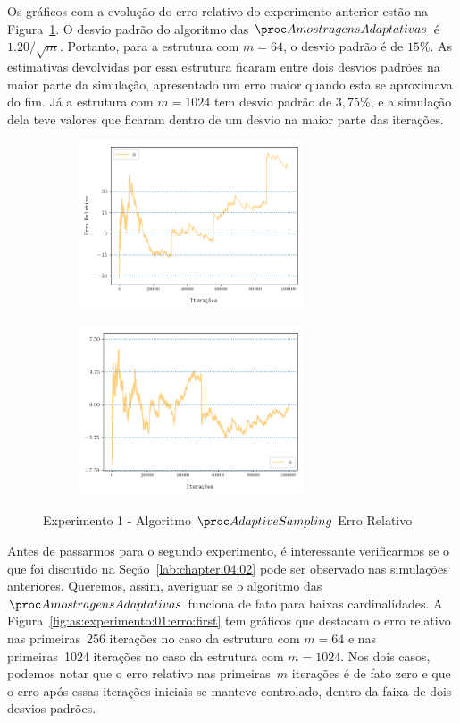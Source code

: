 \newpage
Os gráficos com a evolução do erro relativo do experimento anterior estão na Figura~\ref{fig:as:experimento:01:erro}.
O desvio padrão do algoritmo das $\asampling$ é $1.20/\sqrt{m}$. Portanto, para a estrutura com $m = 64$, o desvio 
padrão é de $15\%$. As estimativas devolvidas por essa estrutura ficaram entre dois desvios padrões na maior parte da 
simulação, apresentado um erro maior quando esta se aproximava do fim. Já a estrutura com $m = 1024$ tem desvio padrão 
de $3{,}75\%$, e a simulação dela teve valores que ficaram dentro de um desvio na maior parte das iterações.

\begin{figure}
  \centering
  \captionsetup{justification=centering,margin=2cm}
  \begin{subfigure}{.5\textwidth}
    \centering
    \includegraphics[width=\linewidth, height=5cm]{figuras/adaptive_sampling_erro_full_64.png}
  \end{subfigure}%
  \begin{subfigure}{.5\textwidth}
    \centering
    \includegraphics[width=\linewidth, height=5cm]{figuras/adaptive_sampling_erro_full_1024.png}
  \end{subfigure}
  \caption{Experimento 1 - Algoritmo $\AS$ \linebreak Erro Relativo}
  \label{fig:as:experimento:01:erro}
\end{figure}

Antes de passarmos para o segundo experimento, é interessante verificarmos se o que foi discutido na 
Seção~\ref{lab:chapter:04:02} pode ser observado nas simulações anteriores. Queremos, assim, averiguar se o algoritmo 
das~$\asampling$ funciona de fato para baixas cardinalidades. A Figura~\ref{fig:as:experimento:01:erro:first} tem
gráficos que destacam o erro relativo nas primeiras~256 iterações no caso da estrutura com $m = 64$ e nas primeiras~1024
iterações no caso da estrutura com $m = 1024$. Nos dois casos, podemos notar que o erro relativo nas primeiras~$m$ 
iterações é de fato zero e que o erro após essas iterações iniciais se manteve controlado, dentro da faixa de dois 
desvios padrões.

